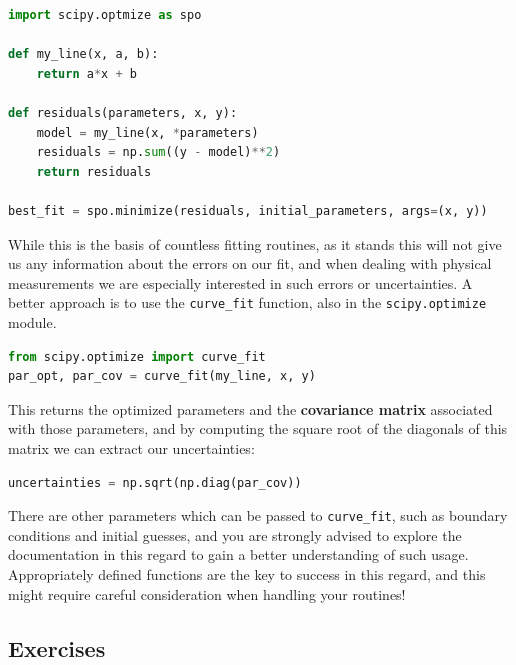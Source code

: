 \documentclass{tufte-book}
\begin{document}
\begin{lstlisting}[language=Python, showstringspaces=false,backgroundcolor=\color{lightgray}, breaklines=true]
import scipy.optmize as spo

def my_line(x, a, b):
    return a*x + b

def residuals(parameters, x, y):
    model = my_line(x, *parameters)
    residuals = np.sum((y - model)**2)
    return residuals

best_fit = spo.minimize(residuals, initial_parameters, args=(x, y))
\end{lstlisting}

While this is the basis of countless fitting routines, as it stands this will not give us any information about the errors on our fit, and when dealing with physical measurements we are especially interested in such errors or uncertainties. A better approach is to use the \verb|curve_fit| function, also in the \verb|scipy.optimize| module.

\begin{lstlisting}[language=Python, showstringspaces=false,backgroundcolor=\color{lightgray}]
from scipy.optimize import curve_fit
par_opt, par_cov = curve_fit(my_line, x, y)

\end{lstlisting}

This returns the optimized parameters and the \textbf{covariance matrix} associated with those parameters, and by computing the square root of the diagonals of this matrix we can extract our uncertainties:

\begin{lstlisting}[language=Python, showstringspaces=false,backgroundcolor=\color{lightgray}]
uncertainties = np.sqrt(np.diag(par_cov))
\end{lstlisting}

There are other parameters which can be passed to \verb|curve_fit|, such as boundary conditions and initial guesses, and you are strongly advised to explore the documentation in this regard to gain a better understanding of such usage. Appropriately defined functions are the key to success in this regard, and this might require careful consideration when handling your routines!
\clearpage
\subsection{Exercises}
\end{document}

